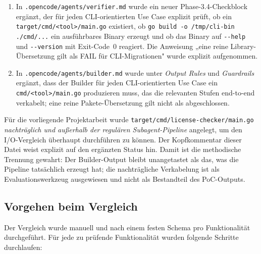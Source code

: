 \begin{enumerate}
\item In \texttt{.opencode/agents/verifier.md} wurde ein neuer Phase-3.4-Checkblock ergänzt, der für jeden CLI-orientierten Use Case explizit prüft, ob ein \texttt{target/cmd/<tool>/main.go} existiert, ob \texttt{go build -o /tmp/cli-bin ./cmd/...} ein ausführbares Binary erzeugt und ob das Binary auf \texttt{-{}-help} und \texttt{-{}-version} mit Exit-Code~0 reagiert. Die Anweisung „eine reine Library-Übersetzung gilt als FAIL für CLI-Migrationen" wurde explizit aufgenommen.
\item In \texttt{.opencode/agents/builder.md} wurde unter \emph{Output Rules} und \emph{Guardrails} ergänzt, dass der Builder für jeden CLI-orientierten Use Case ein \texttt{cmd/<tool>/main.go} produzieren muss, das die relevanten Stufen end-to-end verkabelt; eine reine Pakete-Übersetzung gilt nicht als abgeschlossen.
\end{enumerate}

Für die vorliegende Projektarbeit wurde \texttt{target/cmd/license-checker/main.go} \emph{nachträglich und außerhalb der regulären Subagent-Pipeline} angelegt, um den I/O-Vergleich überhaupt durchführen zu können. Der Kopfkommentar dieser Datei weist explizit auf den ergänzten Status hin. Damit ist die methodische Trennung gewahrt: Der Builder-Output bleibt unangetastet als das, was die Pipeline tatsächlich erzeugt hat; die nachträgliche Verkabelung ist als Evaluationswerkzeug ausgewiesen und nicht als Bestandteil des PoC-Outputs.

\subsection{Vorgehen beim Vergleich}\label{anhang:vorgehen}

Der Vergleich wurde manuell und nach einem festen Schema pro Funktionalität durchgeführt. Für jede zu prüfende Funktionalität wurden folgende Schritte durchlaufen:

